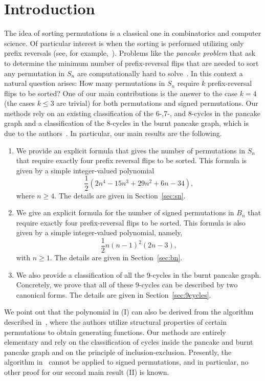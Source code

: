 \documentclass[final]{dmtcs-episciences}
\numberwithin{equation}{section}
\begin{document}
\section{Introduction}
The idea of sorting permutations is a classical one in combinatorics and computer science. Of particular interest is when the sorting is performed utilizing only prefix reversals (see, for example,~\cite{Chitt,Cibulka, GatesPapa}). Problems like the \emph{pancake problem} that ask to determine the minimum number of prefix-reversal flips that are needed to sort any permutation in $S_n$ are computationally hard to solve~\cite{BulFerRusu}. In this context a natural question arises: How many permutations in $S_n$ require $k$ prefix-reversal flips to be sorted?  One of our main contributions is the answer to the case $k=4$ (the cases $k\leq 3$ are trivial) for both permutations and signed permutations. Our methods rely on an existing classification of the 6-,7-, and 8-cycles in the pancake graph and a classification of the 8-cycles in the burnt pancake graph, which is due to the authors~\cite{BBP2018}. In particular, our main results are the following.
\begin{enumerate}
\item[(I)]\label{main:one} We provide an explicit formula that gives the number of permutations in $S_n$ that require exactly four prefix reversal flips to be sorted. This formula is given by a simple integer-valued polynomial
\begin{displaymath}\frac{1}{2} \left(2 n^4 - 15 n^3 + 29 n^2 + 6 n - 34\right),\end{displaymath} where $n\geq4$. The details are given in Section~\ref{sec:sn}.
\item[(II)] We give an explicit formula for the number of signed permutations in $B_n$ that require exactly four prefix-reversal flips to be sorted. This formula is also given by a simple integer-valued polynomial, namely,
\[
 \frac{1}{2} n(n-1)^2(2n-3),
\] 
with $n\geq1$. The details are given in Section~\ref{sec:bn}.
\item[(III)] We also provide a classification of all the 9-cycles in the burnt pancake graph. Concretely, we prove that all of these 9-cycles can be described by two canonical forms. The details are given in Section~\ref{sec:9cycles}.
\end{enumerate} 

We point out that the polynomial in (I) can also be derived from the algorithm described in~\cite{HV16}, where the authors utilize structural properties of certain permutations to obtain generating functions. Our methods are entirely elementary and rely on the classification of cycles inside the pancake and burnt pancake graph and on the principle of inclusion-exclusion. Presently, the algorithm in~\cite{HV16} cannot be applied to signed permutations, and in particular, no other proof for our second main result (II) is known. 
\end{document}
